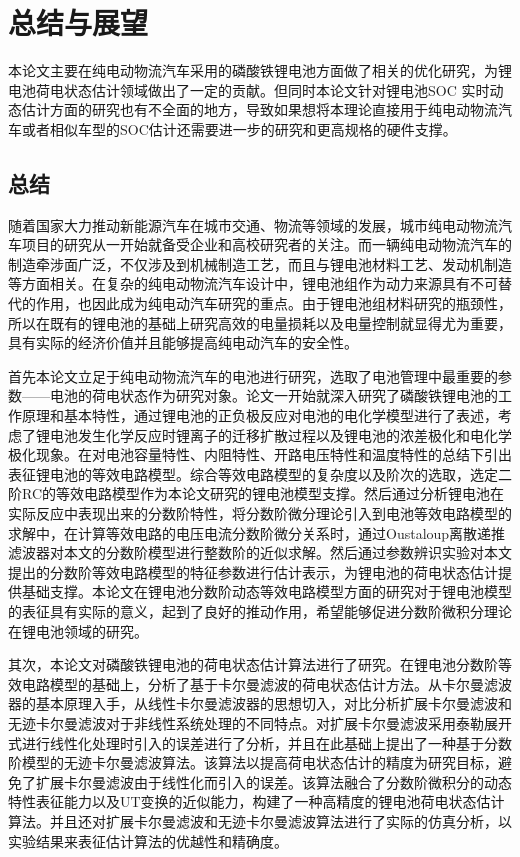 
\chapter{总结与展望}
本论文主要在纯电动物流汽车采用的磷酸铁锂电池方面做了相关的优化研究，为锂电池荷电状态估计领域做出了一定的贡献。但同时本论文针对锂电池SOC 实时动态估计方面的研究也有不全面的地方，导致如果想将本理论直接用于纯电动物流汽车或者相似车型的SOC估计还需要进一步的研究和更高规格的硬件支撑。
\section{总结}
随着国家大力推动新能源汽车在城市交通、物流等领域的发展，城市纯电动物流汽车项目的研究从一开始就备受企业和高校研究者的关注。而一辆纯电动物流汽车的制造牵涉面广泛，不仅涉及到机械制造工艺，而且与锂电池材料工艺、发动机制造等方面相关。在复杂的纯电动物流汽车设计中，锂电池组作为动力来源具有不可替代的作用，也因此成为纯电动汽车研究的重点。由于锂电池组材料研究的瓶颈性，所以在既有的锂电池的基础上研究高效的电量损耗以及电量控制就显得尤为重要，具有实际的经济价值并且能够提高纯电动汽车的安全性。

首先本论文立足于纯电动物流汽车的电池进行研究，选取了电池管理中最重要的参数——电池的荷电状态作为研究对象。论文一开始就深入研究了磷酸铁锂电池的工作原理和基本特性，通过锂电池的正负极反应对电池的电化学模型进行了表述，考虑了锂电池发生化学反应时锂离子的迁移扩散过程以及锂电池的浓差极化和电化学极化现象。在对电池容量特性、内阻特性、开路电压特性和温度特性的总结下引出表征锂电池的等效电路模型。综合等效电路模型的复杂度以及阶次的选取，选定二阶RC的等效电路模型作为本论文研究的锂电池模型支撑。然后通过分析锂电池在实际反应中表现出来的分数阶特性，将分数阶微分理论引入到电池等效电路模型的求解中，在计算等效电路的电压电流分数阶微分关系时，通过Oustaloup离散递推滤波器对本文的分数阶模型进行整数阶的近似求解。然后通过参数辨识实验对本文提出的分数阶等效电路模型的特征参数进行估计表示，为锂电池的荷电状态估计提供基础支撑。本论文在锂电池分数阶动态等效电路模型方面的研究对于锂电池模型的表征具有实际的意义，起到了良好的推动作用，希望能够促进分数阶微积分理论在锂电池领域的研究。

其次，本论文对磷酸铁锂电池的荷电状态估计算法进行了研究。在锂电池分数阶等效电路模型的基础上，分析了基于卡尔曼滤波的荷电状态估计方法。从卡尔曼滤波器的基本原理入手，从线性卡尔曼滤波器的思想切入，对比分析扩展卡尔曼滤波和无迹卡尔曼滤波对于非线性系统处理的不同特点。对扩展卡尔曼滤波采用泰勒展开式进行线性化处理时引入的误差进行了分析，并且在此基础上提出了一种基于分数阶模型的无迹卡尔曼滤波算法。该算法以提高荷电状态估计的精度为研究目标，避免了扩展卡尔曼滤波由于线性化而引入的误差。该算法融合了分数阶微积分的动态特性表征能力以及UT变换的近似能力，构建了一种高精度的锂电池荷电状态估计算法。并且还对扩展卡尔曼滤波和无迹卡尔曼滤波算法进行了实际的仿真分析，以实验结果来表征估计算法的优越性和精确度。

